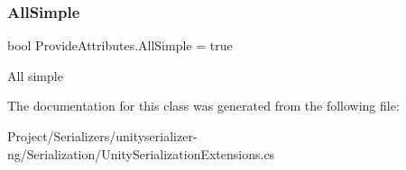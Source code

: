 \subsubsection{\texorpdfstring{All\+Simple}{AllSimple}}
{\footnotesize\ttfamily bool Provide\+Attributes.\+All\+Simple = true\hspace{0.3cm}{\ttfamily [protected]}}



All simple 



The documentation for this class was generated from the following file\+:\begin{DoxyCompactItemize}
\item 
Project/\+Serializers/unityserializer-\/ng/\+Serialization/Unity\+Serialization\+Extensions.\+cs\end{DoxyCompactItemize}
